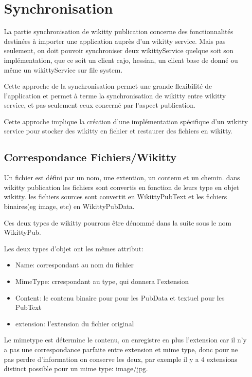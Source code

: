 \section{Synchronisation}

La partie synchronisation de wikitty publication concerne des fonctionnalités
destinées à importer une application auprès d'un wikitty service. Mais pas
seulement, on doit pouvoir synchroniser deux wikittyService quelque soit son
implémentation, que ce soit un client cajo, hessian, un client base de donné ou
même un wikittyService sur file system.

Cette approche de la synchronisation permet une grande flexibilité de
l'application et permet à terme la synchronisation de wikitty entre wikitty
service, et pas seulement ceux concerné par l'aspect publication.

Cette approche implique la création d'une implémentation spécifique d'un wikitty
service pour stocker des wikitty en fichier et restaurer des fichiers en
wikitty.


\subsection{Correspondance Fichiers/Wikitty}

Un fichier est défini par un nom, une extention, un contenu et un chemin.
dans wikitty publication les fichiers sont convertis en fonction de leurs type
en objet wikitty. les fichiers sources sont convertit en WikittyPubText et les
fichiers binaires(eg image, etc) en WikittyPubData.

Ces deux types de wikitty pourrons être dénommé dans la suite sous le nom
WikittyPub. 

Les deux types d'objet ont les mêmes attribut:
\begin{itemize}
\item Name: correspondant au nom du fichier
\item MimeType: crrespondant au type, qui donnera l'extension
\item Content: le contenu binaire pour pour les PubData et textuel pour les
PubText
\item extension: l'extension du fichier original
\end{itemize}

Le mimetype est détermine le contenu, on enregistre en plus l'extension car il
n'y a pas une correspondance parfaite entre extension et mime type, donc pour
ne pas perdre d'information on conserve les deux, par exemple il y a 4
extensions distinct possible pour un mime type: image/jpg. 

